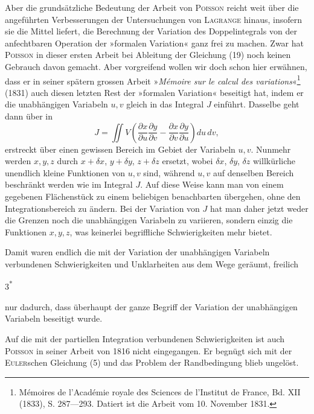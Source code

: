 Aber die grundsätzliche Bedeutung der Arbeit von \textsc{Poisson} reicht weit
über die angeführten Verbesserungen der Untersuchungen von \textsc{Lagrange} hinaus,
insofern sie die Mittel liefert, die Berechnung der Variation des Doppelintegrals
von der anfechtbaren Operation der »formalen Variation« ganz frei
zu machen. Zwar hat \textsc{Poisson} in dieser ersten Arbeit bei Ableitung der
Gleichung (19) noch keinen Gebrauch davon gemacht. Aber vorgreifend wollen
wir doch schon hier erwähnen, dass er in seiner spätern grossen Arbeit »\textit{Mémoire
sur le calcul des variations}«\footnote{Mémoires de l'Académie royale des Sciences de l'Institut de France, Bd. XII (1833), S. 287—293. Datiert ist die Arbeit vom 10. November 1831.} (1831) auch diesen letzten Rest der »formalen
Variation« beseitigt hat, indem er die unabhängigen Variabeln $u,v$
gleich in das Integral $J$ einführt. Dasselbe geht dann über in
\begin{equation*}
J=\iint V\left(\frac{\partial x}{\partial u}\frac{\partial y}{\partial v}-\frac{\partial x}{\partial v}\frac{\partial y}{\partial u}\right)du\,dv,\tag{24}
\end{equation*}
erstreckt über einen gewissen Bereich im Gebiet der Variabeln $u,v$. Nunmehr
werden $x,y,z$ durch $x+\delta x$, $y+\delta y$, $z+\delta z$ ersetzt, wobei $\delta x$, $\delta y$, $\delta z$ willkürliche
unendlich kleine Funktionen von $u,v$ sind, während $u,v$ auf denselben
Bereich beschränkt werden wie im Integral $J$. Auf diese Weise kann
man von einem gegebenen Flächenstück zu einem beliebigen benachbarten
übergehen, ohne den Integrationsbereich zu ändern. Bei der Variation von
$J$ hat man daher jetzt weder die Grenzen noch die unabhängigen Variabeln
zu variieren, sondern einzig die Funktionen $x,y,z$, was keinerlei begriffliche
Schwierigkeiten mehr bietet.

Damit waren endlich die mit der Variation der unabhängigen Variabeln
verbundenen Schwierigkeiten und Unklarheiten aus dem Wege geräumt, freilich
\par\smallskip\noindent\hfill{\small 3\textsuperscript{*}}\par
\clearpage{}
\noindent nur dadurch, dass überhaupt der ganze Begriff der Variation der unabhängigen
Variabeln beseitigt wurde.

Auf die mit der partiellen Integration verbundenen Schwierigkeiten ist
auch \textsc{Poisson} in seiner Arbeit von 1816 nicht eingegangen. Er begnügt sich
mit der \textsc{Euler}schen Gleichung (5) und das Problem der Randbedingung blieb
ungelöst.

